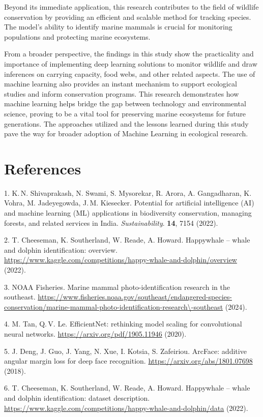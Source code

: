 \documentclass[twocolumn]{article}
\begin{document}
Beyond its immediate application, this research contributes to the field of wildlife conservation by providing an efficient and scalable method for tracking species. The model's ability to identify marine mammals is crucial for monitoring populations and protecting marine ecosystems.

From a broader perspective, the findings in this study show the practicality and importance of implementing deep learning solutions to monitor wildlife and draw inferences on carrying capacity, food webs, and other related aspects. The use of machine learning also provides an instant mechanism to support ecological studies and inform conservation programs. This research demonstrates how machine learning helps bridge the gap between technology and environmental science, proving to be a vital tool for preserving marine ecosystems for future generations. The approaches utilized and the lessons learned during this study pave the way for broader adoption of Machine Learning in ecological research. 

\section{References}

1. K.\,N. Shivaprakash, N. Swami, S. Mysorekar, R. Arora, A. Gangadharan, K. Vohra, M. Jadeyegowda, J.\,M. Kiesecker. Potential for artificial intelligence (AI) and machine learning (ML) applications in biodiversity conservation, managing forests, and related services in India. \textit{Sustainability}. \textbf{14}, 7154 (2022).

2. T. Cheeseman, K. Southerland, W. Reade, A. Howard. Happywhale – whale and dolphin identification: overview. \url{https://www.kaggle.com/competitions/happy-whale-and-dolphin/overview} (2022).

3. NOAA Fisheries. Marine mammal photo-identification research in the southeast. \url{https://www.fisheries.noaa.gov/southeast/endangered-species-conservation/marine-mammal-photo-identification-research\-southeast} (2024).

4. M. Tan, Q.\,V. Le. EfficientNet: rethinking model scaling for convolutional neural networks. \url{https://arxiv.org/pdf/1905.11946} (2020).

5. J. Deng, J. Guo, J. Yang, N. Xue, I. Kotsia, S. Zafeiriou. ArcFace: additive angular margin loss for deep face recognition. \url{https://arxiv.org/abs/1801.07698} (2018).

6. T. Cheeseman, K. Southerland, W. Reade, A. Howard. Happywhale – whale and dolphin identification: dataset description. \url{https://www.kaggle.com/competitions/happy-whale-and-dolphin/data} (2022).
\end{document}
